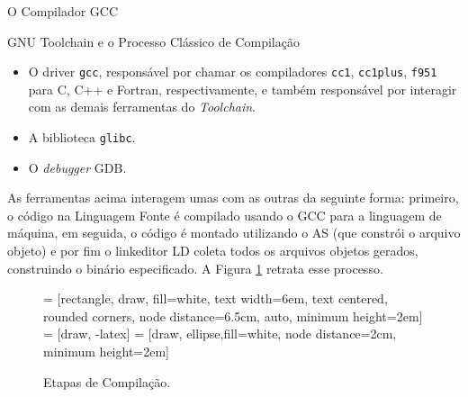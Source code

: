 \begin{section}{O Compilador GCC}
\begin{subsection}{GNU Toolchain e o Processo Clássico de Compilação}
\begin{itemize}
    \item O driver \texttt{gcc}, responsável por chamar os compiladores \texttt{cc1},
        \texttt{cc1plus}, \texttt{f951} para C, C++ e Fortran, respectivamente,
        e também responsável por interagir com as demais ferramentas do 
        \textit{Toolchain}.

    \item A biblioteca \texttt{glibc}.

    \item O \textit{debugger} GDB.
\end{itemize}

As ferramentas acima interagem umas com as outras da seguinte forma: primeiro, o código na
Linguagem Fonte é compilado usando o GCC para a linguagem de máquina, em seguida, o código
é montado utilizando o AS (que constrói o arquivo objeto) e por fim o linkeditor
LD coleta todos os arquivos objetos gerados, construindo o binário especificado. A Figura
\ref{fig:gnu_toolchain} retrata esse processo.


\begin{figure}
 = [rectangle, draw, fill=white,
    text width=6em, text centered, rounded corners, node distance=6.5cm, auto, minimum height=2em]
 = [draw, -latex]
 = [draw, ellipse,fill=white, node distance=2cm,
    minimum height=2em]
\begin{center}
\end{center}
\caption{Etapas de Compilação.}
\label{fig:gnu_toolchain}
\end{figure}


\end{subsection}
\end{section}
